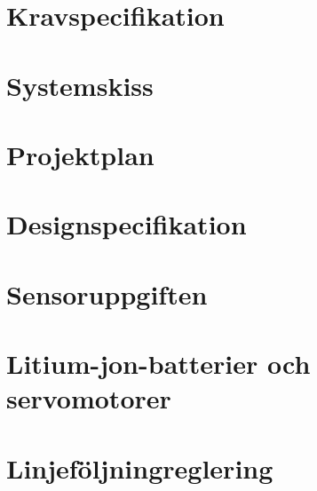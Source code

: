 

\section{Kravspecifikation}

\section{Systemskiss}

\section{Projektplan}

\section{Designspecifikation}

\section{Sensoruppgiften}

\section{Litium-jon-batterier och servomotorer}

\section{Linjeföljningreglering}



